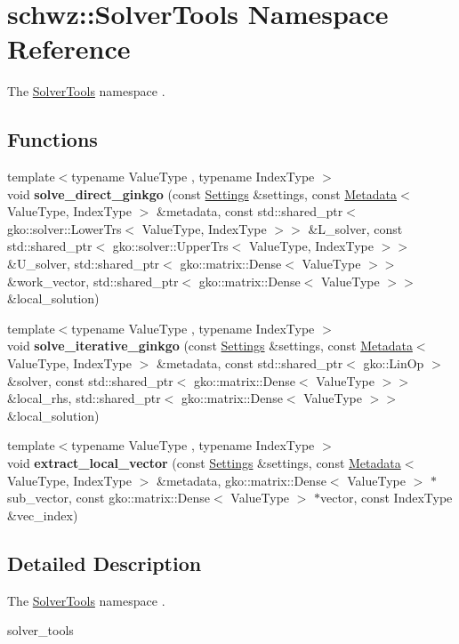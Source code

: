 \hypertarget{namespaceschwz_1_1SolverTools}{}\section{schwz\+:\+:Solver\+Tools Namespace Reference}
\label{namespaceschwz_1_1SolverTools}


The \hyperlink{namespaceschwz_1_1SolverTools}{Solver\+Tools} namespace .  


\subsection*{Functions}
\begin{DoxyCompactItemize}
\item 
\mbox{\label{namespaceschwz_1_1SolverTools_ae0eb9798ac886b0e45c304a97fe70176}} 
{\footnotesize template$<$typename Value\+Type , typename Index\+Type $>$ }\\void {\bfseries solve\+\_\+direct\+\_\+ginkgo} (const \hyperlink{structschwz_1_1Settings}{Settings} \&settings, const \hyperlink{structschwz_1_1Metadata}{Metadata}$<$ Value\+Type, Index\+Type $>$ \&metadata, const std\+::shared\+\_\+ptr$<$ gko\+::solver\+::\+Lower\+Trs$<$ Value\+Type, Index\+Type $>$$>$ \&L\+\_\+solver, const std\+::shared\+\_\+ptr$<$ gko\+::solver\+::\+Upper\+Trs$<$ Value\+Type, Index\+Type $>$$>$ \&U\+\_\+solver, std\+::shared\+\_\+ptr$<$ gko\+::matrix\+::\+Dense$<$ Value\+Type $>$$>$ \&work\+\_\+vector, std\+::shared\+\_\+ptr$<$ gko\+::matrix\+::\+Dense$<$ Value\+Type $>$$>$ \&local\+\_\+solution)
\item 
\mbox{\label{namespaceschwz_1_1SolverTools_a246fa524f65b66c548ecd16a74124356}} 
{\footnotesize template$<$typename Value\+Type , typename Index\+Type $>$ }\\void {\bfseries solve\+\_\+iterative\+\_\+ginkgo} (const \hyperlink{structschwz_1_1Settings}{Settings} \&settings, const \hyperlink{structschwz_1_1Metadata}{Metadata}$<$ Value\+Type, Index\+Type $>$ \&metadata, const std\+::shared\+\_\+ptr$<$ gko\+::\+Lin\+Op $>$ \&solver, const std\+::shared\+\_\+ptr$<$ gko\+::matrix\+::\+Dense$<$ Value\+Type $>$$>$ \&local\+\_\+rhs, std\+::shared\+\_\+ptr$<$ gko\+::matrix\+::\+Dense$<$ Value\+Type $>$$>$ \&local\+\_\+solution)
\item 
\mbox{\label{namespaceschwz_1_1SolverTools_a193e789c220cc7675b4cd7da073f3779}} 
{\footnotesize template$<$typename Value\+Type , typename Index\+Type $>$ }\\void {\bfseries extract\+\_\+local\+\_\+vector} (const \hyperlink{structschwz_1_1Settings}{Settings} \&settings, const \hyperlink{structschwz_1_1Metadata}{Metadata}$<$ Value\+Type, Index\+Type $>$ \&metadata, gko\+::matrix\+::\+Dense$<$ Value\+Type $>$ $\ast$sub\+\_\+vector, const gko\+::matrix\+::\+Dense$<$ Value\+Type $>$ $\ast$vector, const Index\+Type \&vec\+\_\+index)
\end{DoxyCompactItemize}


\subsection{Detailed Description}
The \hyperlink{namespaceschwz_1_1SolverTools}{Solver\+Tools} namespace . 

solver\+\_\+tools 